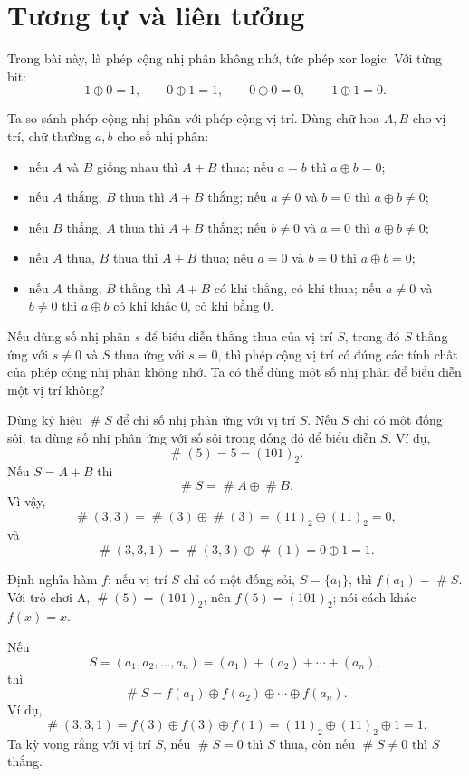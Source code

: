 \documentclass[11pt]{article}
\newcommand{\nimadd}{\oplus}
\newcommand{\val}[1]{\mathop{\#}\!#1}
\begin{document}
\section{Tương tự và liên tưởng}

Trong bài này,  là phép cộng nhị phân không nhớ, tức
phép xor logic. Với từng bit:
\[
  1\nimadd 0=1,\qquad 0\nimadd 1=1,\qquad
  0\nimadd 0=0,\qquad 1\nimadd 1=0.
\]

Ta so sánh phép cộng nhị phân với phép cộng vị trí. Dùng chữ hoa \(A,B\) cho
vị trí, chữ thường \(a,b\) cho số nhị phân:
\begin{itemize}
  \item nếu \(A\) và \(B\) giống nhau thì \(A+B\) thua; nếu \(a=b\) thì
  \(a\nimadd b=0\);
  \item nếu \(A\) thắng, \(B\) thua thì \(A+B\) thắng; nếu \(a\ne0\) và
  \(b=0\) thì \(a\nimadd b\ne0\);
  \item nếu \(B\) thắng, \(A\) thua thì \(A+B\) thắng; nếu \(b\ne0\) và
  \(a=0\) thì \(a\nimadd b\ne0\);
  \item nếu \(A\) thua, \(B\) thua thì \(A+B\) thua; nếu \(a=0\) và \(b=0\)
  thì \(a\nimadd b=0\);
  \item nếu \(A\) thắng, \(B\) thắng thì \(A+B\) có khi thắng, có khi thua;
  nếu \(a\ne0\) và \(b\ne0\) thì \(a\nimadd b\) có khi khác \(0\), có khi
  bằng \(0\).
\end{itemize}

Nếu dùng số nhị phân \(s\) để biểu diễn thắng thua của vị trí \(S\), trong đó
\(S\) thắng ứng với \(s\ne0\) và \(S\) thua ứng với \(s=0\), thì phép cộng vị
trí có đúng các tính chất của phép cộng nhị phân không nhớ. Ta có thể dùng
một số nhị phân để biểu diễn một vị trí không?

Dùng ký hiệu \(\val{S}\) để chỉ số nhị phân ứng với vị trí \(S\). Nếu \(S\)
chỉ có một đống sỏi, ta dùng số nhị phân ứng với số sỏi trong đống đó để biểu
diễn \(S\). Ví dụ,
\[
  \val{(5)}=5=(101)_2.
\]
Nếu \(S=A+B\) thì
\[
  \val{S}=\val{A}\nimadd\val{B}.
\]
Vì vậy,
\[
  \val{(3,3)}=\val{(3)}\nimadd\val{(3)}=(11)_2\nimadd(11)_2=0,
\]
và
\[
  \val{(3,3,1)}=\val{(3,3)}\nimadd\val{(1)}=0\nimadd1=1.
\]

Định nghĩa hàm \(f\): nếu vị trí \(S\) chỉ có một đống sỏi, \(S=\{a_1\}\),
thì \(f(a_1)=\val{S}\). Với trò chơi A, \(\val{(5)}=(101)_2\), nên
\(f(5)=(101)_2\); nói cách khác \(f(x)=x\).

Nếu
\[
  S=(a_1,a_2,\ldots,a_n)=(a_1)+(a_2)+\cdots+(a_n),
\]
thì
\[
  \val{S}=f(a_1)\nimadd f(a_2)\nimadd\cdots\nimadd f(a_n).
\]
Ví dụ,
\[
  \val{(3,3,1)}
  =f(3)\nimadd f(3)\nimadd f(1)
  =(11)_2\nimadd(11)_2\nimadd1=1.
\]
Ta kỳ vọng rằng với vị trí \(S\), nếu \(\val{S}=0\) thì \(S\) thua, còn nếu
\(\val{S}\ne0\) thì \(S\) thắng.
\end{document}
